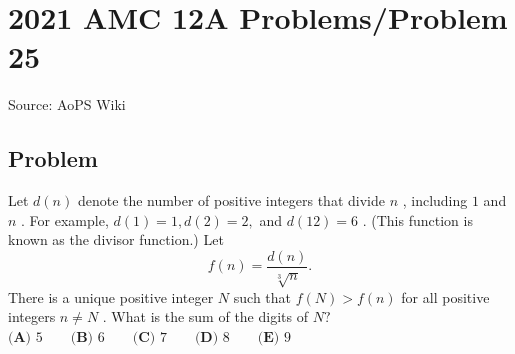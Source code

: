 \documentclass[12pt]{article}
\begin{document}
\section*{{2021 AMC 12A Problems/Problem 25}}
Source: AoPS Wiki

\subsection*{Problem}
Let $d(n)$ denote the number of positive integers that divide $n$ , including $1$ and $n$ . For example, $d(1)=1,d(2)=2,$ and $d(12)=6$ . (This function is known as the divisor function.) Let \[f(n)=\frac{d(n)}{\sqrt [3]n}.\] There is a unique positive integer $N$ such that $f(N)>f(n)$ for all positive integers $n\ne N$ . What is the sum of the digits of $N?$ $\textbf{(A) }5 \qquad \textbf{(B) }6 \qquad \textbf{(C) }7 \qquad \textbf{(D) }8\qquad \textbf{(E) }9$
\end{document}
